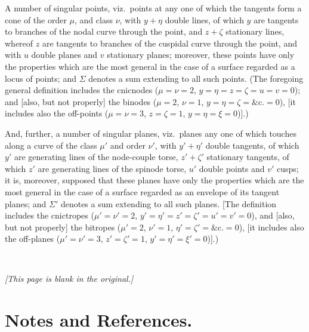 \documentclass[11pt,a4paper]{article}
\theoremstyle{plain}
\theoremstyle{definition}
\theoremstyle{remark}
\begin{document}
A number of singular points, viz.\ points at any one of which the tangents form a cone of the order $\mu$, and class $\nu$, with $y+\eta$ double lines, of which $y$ are tangents to branches of the nodal curve through the point, and $z+\zeta$ stationary lines, whereof $z$ are tangents to branches of the cuspidal curve through the point, and with $u$ double planes and $v$ stationary planes; moreover, these points have only the properties which are the most general in the case of a surface regarded as a locus of points; and $\Sigma$ denotes a sum extending to all such points. (The foregoing general definition includes the cnicnodes ($\mu=\nu=2$, $y=\eta=z=\zeta=u=v=0$); and [also, but not properly] the binodes ($\mu=2$, $\nu=1$, $y=\eta=\zeta=\text{\&c.}=0$), [it includes also the off-points ($\mu=\nu=3$, $z=\zeta=1$, $y=\eta=\xi=0$)].)

And, further, a number of singular planes, viz.\ planes any one of which touches along a curve of the class $\mu'$ and order $\nu'$, with $y'+\eta'$ double tangents, of which $y'$ are generating lines of the node-couple torse, $z'+\zeta'$ stationary tangents, of which $z'$ are generating lines of the spinode torse, $u'$ double points and $v'$ cusps; it is, moreover, supposed that these planes have only the properties which are the most general in the case of a surface regarded as an envelope of its tangent planes; and $\Sigma'$ denotes a sum extending to all such planes. [The definition includes the cnictropes ($\mu'=\nu'=2$, $y'=\eta'=z'=\zeta'=u'=v'=0$), and [also, but not properly] the bitropes ($\mu'=2$, $\nu'=1$, $\eta'=\zeta'=\text{\&c.}=0$), [it includes also the off-planes ($\mu'=\nu'=3$, $z'=\zeta'=1$, $y'=\eta'=\xi'=0$)].)

\newpage
\setcounter{page}{620}

\thispagestyle{empty}
\ 
\vfill
\begin{center}
\textit{[This page is blank in the original.]}
\end{center}
\vfill

\newpage
\setcounter{page}{621}


\section*{Notes and References.}
\end{document}

